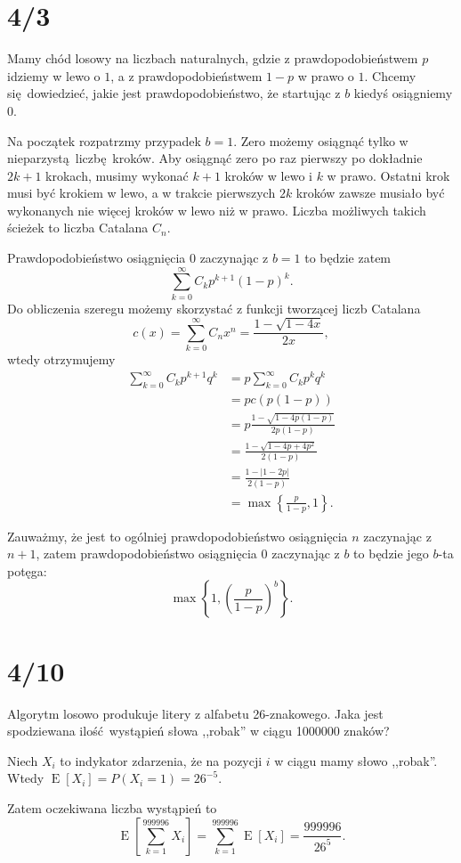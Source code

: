 \documentclass[a4paper, 12pt]{article}
\title{}
\author{Wiktor Kuchta}
\date{\vspace{-4ex}}
\newcommand{\modulus}[1]{\left| #1 \right|}
\newcommand{\abs}{\modulus}
\DeclareMathOperator{\EX}{E}
\begin{document}
\maketitle

\section*{4/3}
Mamy chód losowy na liczbach naturalnych,
gdzie z prawdopodobieństwem $p$ idziemy w lewo o $1$,
a z prawdopodobieństwem $1-p$ w prawo o $1$.
Chcemy się dowiedzieć, jakie jest prawdopodobieństwo,
że startując z $b$ kiedyś osiągniemy $0$.

Na początek rozpatrzmy przypadek $b=1$.
Zero możemy osiągnąć tylko w nieparzystą liczbę kroków.
Aby osiągnąć zero po raz pierwszy po dokładnie $2k+1$ krokach,
musimy wykonać $k+1$ kroków w lewo i $k$ w prawo.
Ostatni krok musi być krokiem w lewo, a w trakcie pierwszych $2k$
kroków zawsze musiało być wykonanych nie więcej kroków w lewo niż w prawo.
Liczba możliwych takich ścieżek to liczba Catalana $C_n$.

Prawdopodobieństwo osiągnięcia $0$ zaczynając z $b=1$ to będzie zatem
$$∑_{k=0}^∞ C_k p^{k+1} (1-p)^k.$$
Do obliczenia szeregu możemy skorzystać z funkcji tworzącej liczb Catalana
$$c(x) = ∑_{k=0}^∞ C_n x^n = \frac{1-\sqrt{1-4x}}{2x},$$
wtedy otrzymujemy
\begin{align*}
∑_{k=0}^∞ C_k p^{k+1} q^k
&= p∑_{k=0}^∞ C_k p^k q^k \\
&= p c(p(1-p)) \\
&= p\frac{1-\sqrt{1-4p(1-p)}}{2p(1-p)} \\
&= \frac{1-\sqrt{1-4p+4p^2}}{2(1-p)} \\
&= \frac{1-\abs{1-2p}}{2(1-p)} \\
&= \max \left\{\frac{p}{1-p}, 1\right\}.
\end{align*}

Zauważmy,
że jest to ogólniej prawdopodobieństwo osiągnięcia $n$ zaczynając z $n+1$,
zatem prawdopodobieństwo osiągnięcia $0$ zaczynając z $b$ to będzie jego $b$-ta
potęga:
$$\max \left\{1, \left(\frac{p}{1-p}\right)^b \right\}.$$

\section*{4/10}
Algorytm losowo produkuje litery z alfabetu 26-znakowego.
Jaka jest spodziewana ilość wystąpień słowa ,,robak'' w ciągu 1000000 znaków?

Niech $X_i$ to indykator zdarzenia,
że na pozycji $i$ w ciągu mamy słowo ,,robak''.
Wtedy $\EX[X_i] = P(X_i=1) = 26^{-5}.$

Zatem oczekiwana liczba wystąpień to
$$\EX\left[∑_{k=1}^{999996} X_i\right] = ∑_{k=1}^{999996} \EX[X_i]
= \frac{999996}{26^5}.$$
\end{document}
